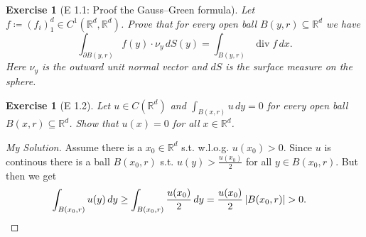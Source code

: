 \documentclass{report}
\theoremstyle{tommy}
\newtheorem{ex}[defn]{Exercise}
\renewcommand\div{\operatorname{div}}
\begin{document}
    

  \begin{ex}[E 1.1: Proof the Gauss–Green formula]
    Let \(f \coloneqq (f_i)_1^d \in C^1(\mathbb{R}^d, \mathbb{R}^d)\). Prove that for every open ball \(B(y, r) \subseteq \mathbb{R}^d\) we have \[\int_{\partial B(y, r)} f(y) \cdot \nu_y \, dS(y) = \int_{B(y, r)}\div f \, dx.\]
    Here \(\nu_y\) is the outward unit normal vector and \(dS\) is the surface measure on the sphere.
  \end{ex}

  \begin{ex}[E 1.2]
    Let \(u \in C(\mathbb{R}^d)\) and \(\int_{B(x, r)} u \, dy = 0\) for every open ball \(B(x, r) \subseteq \mathbb{R}^d\). Show that \(u(x) = 0\) for all \(x \in \mathbb{R}^d\).
  \end{ex}

  \begin{proof}[My Solution]
    Assume there is a \(x_0 \in \mathbb{R}^d\) s.t. w.l.o.g. \(u(x_0) > 0\). Since \(u\) is continous there is a ball \(B(x_0, r)\) s.t. \(u(y) > \frac{u(x_0)}{2}\) for all \(y \in B(x_0, r)\). But then we get
    \begin{align*}
      \int_{B(x_0, r)} u(y) \, dy
      &\ge \int_{B(x_0, r)} \frac{u(x_0)}{2} \, dy
      = \frac{u(x_0)}{2} \, |B(x_0, r)| > 0. \qedhere
    \end{align*}
  \end{proof}
\end{document}
